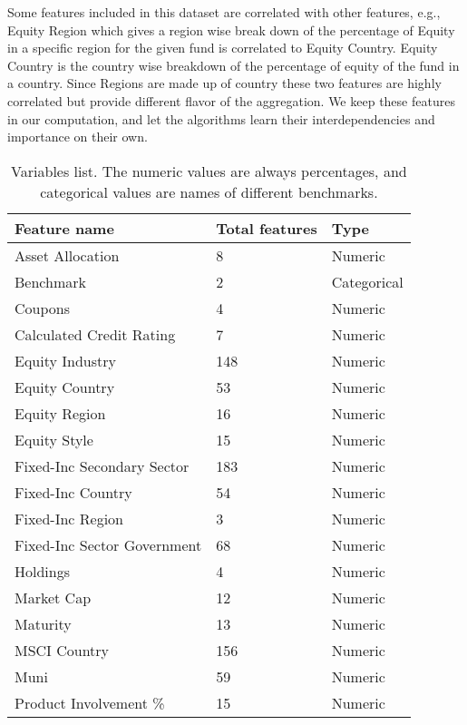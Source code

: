 \documentclass[sigconf]{acmart}
\begin{document}
Some features included in this dataset are correlated with other features, e.g., Equity Region which gives a region wise break down of the percentage of Equity in a specific region for the given fund is correlated to Equity Country. Equity Country is the country wise breakdown of the percentage of equity of the fund in a country. Since Regions are made up of country these two features are highly correlated but provide different flavor of the aggregation. We keep these features in our computation, and let the algorithms learn their interdependencies and importance on their own. \\
\begin{table}[h!]
\begin{tabular}{l|l|l}
\hline
\textbf{Feature name}                  & \textbf{Total features} & \textbf{Type} \\ \hline
Asset Allocation                       & 8      & Numeric       \\ \hline
Benchmark                              & 2      & Categorical   \\ \hline
Coupons                                &4       & Numeric       \\ \hline
Calculated Credit Rating               &7       & Numeric       \\ \hline
Equity Industry                        & 148    & Numeric       \\ \hline
Equity Country                         & 53     & Numeric       \\ \hline
Equity Region                          &16      & Numeric       \\ \hline
Equity Style                           &15      & Numeric       \\ \hline
Fixed-Inc Secondary Sector             & 183    & Numeric       \\ \hline
Fixed-Inc Country                      & 54     & Numeric       \\ \hline
Fixed-Inc Region                       & 3      & Numeric       \\ \hline
Fixed-Inc Sector Government            & 68     & Numeric       \\ \hline
Holdings                               & 4      & Numeric       \\ \hline
Market Cap                             & 12     & Numeric       \\ \hline
Maturity                               &13      & Numeric       \\ \hline
MSCI Country                           & 156    & Numeric       \\ \hline
Muni                                   & 59     & Numeric       \\ \hline
Product Involvement \%                 & 15     & Numeric       \\ \hline

\end{tabular}
\caption{Variables list. The numeric values are always percentages, and categorical values are names of different benchmarks.}
\label{table:feature_list}
\end{table}
\end{document}
